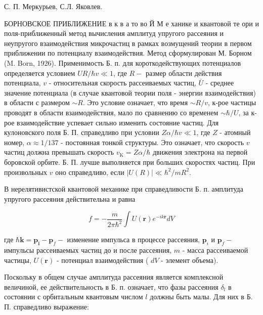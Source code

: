 \documentclass[10pt]{article}
\begin{document}
С. П. Меркурьев, С.Л. Яковлев.



БОРНОВСКОЕ ПРИБЛИЖЕНИЕ в к в а то во Й М е ханике и квантовой те ори и поля-приближенный метод вычисления амплитуд упругого рассеяния и неупругого взаимодействия микрочастиц в рамках возмущений теории в первом приближении по потенциалу взаимодействия. Метод сформулирован М. Борном (M. Born, 1926). Применимость Б. п. для короткодействующих потенциалов определяется условием $U R / \hbar v \ll 1$, где $R-$ размер области действия потенциала, $v$ - относительная скорость рассеиваемых частиц, $\bar{U}$ - среднее значение потенциала (в случае квантовой теории поля - энергии взаимодействия) в области с размером $\sim R$. Это условие означает, что время $\sim R / v$, к-рое частицы проводят в области взаимодействия, мало по сравнению со временем $\sim \hbar / U$, за к-рое взаимодействие успевает сильно изменить состояние частиц. Для кулоновского поля Б. П. справедливо при условии $Z \alpha / \hbar v \ll 1$, где $Z$ - атомный номер, $\alpha \approx 1 / 137$ - постоянная тонкой структуры. Это означает, что скорость $v$ частиц должна превышать скорость $v_{\mathrm{K}}=Z \alpha / \hbar$ движения электрона на первой боровской орбите. Б. П. лучше выполняется при больших скоростях частиц. При произвольных $v$ оно справедливо, если $|U(R)| \ll \hbar^{2} / m R^{2}$.



В нерелятивистской квантовой механике при справедливости Б. п. амплитуда упругого рассеяния действительна и равна



\[

f=-\frac{m}{2 \pi \hbar^{2}} \int U(\boldsymbol{r}) e^{-i k \boldsymbol{r}} d V

\]



где $\hbar \boldsymbol{k}=\boldsymbol{p}_{\boldsymbol{i}}-\boldsymbol{p}_{f}-$ изменение импульса в процессе рассеяния, $\boldsymbol{p}_{i}$ и $\boldsymbol{p}_{f}-$ импульсы рассеиваемых частиц до и после рассеяния, $m$ - масса рассеиваемой частицы, $U(\boldsymbol{r})$ - потенциал взаимодействия ( $d V$ - элемент объема).



Поскольку в общем случае амплитуда рассеяния является комплексной величиной, ее действительность в Б. п. означает, что фазы рассеяния $\delta_{l}$ в состоянии с орбитальным квантовым числом $l$ должны быть малы. Для них в Б. П. справедливо выражение:
\end{document}
